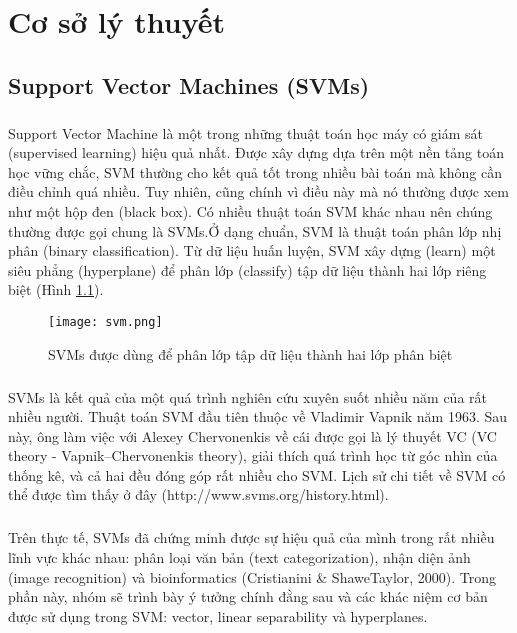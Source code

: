 \chapter{Cơ sở lý thuyết}
\ifpdf
    \graphicspath{{Chapter3/Chapter3Figs/PNG/}{Chapter3/Chapter3Figs/PDF/}{Chapter3/Chapter3Figs/}}
\else
    \graphicspath{{Chapter3/Chapter3Figs/EPS/}{Chapter3/Chapter3Figs/}}
\fi

\section{Support Vector Machines (SVMs)}
\paragraph*{}
Support Vector Machine là một trong những thuật toán học máy có giám sát (supervised learning) hiệu quả nhất. Được xây dựng dựa trên một nền tảng toán học vững chắc, SVM thường cho kết quả tốt trong nhiều bài toán mà không cần điều chỉnh quá nhiều. Tuy nhiên, cũng chính vì điều này mà nó thường được xem như một hộp đen (black box). Có nhiều thuật toán SVM khác nhau nên chúng thường được gọi chung là SVMs.Ở dạng chuẩn, SVM là thuật toán phân lớp nhị phân (binary classification). Từ dữ liệu huấn luyện, SVM xây dựng (learn) một siêu phẳng (hyperplane) để phân lớp (classify) tập dữ liệu thành hai lớp riêng biệt (Hình \ref{fig:svm}).

\begin{figure}[h!]
	\centering
	\captionsetup{width=0.8\textwidth}
	\texttt{[image: svm.png]}
	\caption{SVMs được dùng để phân lớp tập dữ liệu thành hai lớp phân biệt}
    \label{fig:svm}
\end{figure}

\paragraph*{}
SVMs là kết quả của một quá trình nghiên cứu xuyên suốt nhiều năm của rất nhiều người. Thuật toán SVM đầu tiên thuộc về Vladimir Vapnik năm 1963. Sau này, ông làm việc với Alexey Chervonenkis về cái được gọi là lý thuyết VC (VC theory - Vapnik–Chervonenkis theory), giải thích quá trình học từ góc nhìn của thống kê, và cả hai đều đóng góp rất nhiều cho SVM. Lịch sử chi tiết về SVM có thể được tìm thấy ở đây (http://www.svms.org/history.html).

\paragraph*{}
Trên thực tế, SVMs đã chứng minh được sự hiệu quả của mình trong rất nhiều lĩnh vực khác nhau: phân loại văn bản (text categorization), nhận diện ảnh (image recognition) và bioinformatics (Cristianini \& ShaweTaylor, 2000). Trong phần này, nhóm sẽ trình bày ý tưởng chính đằng sau và các khác niệm cơ bản được sử dụng trong SVM: vector, linear separability và hyperplanes.


